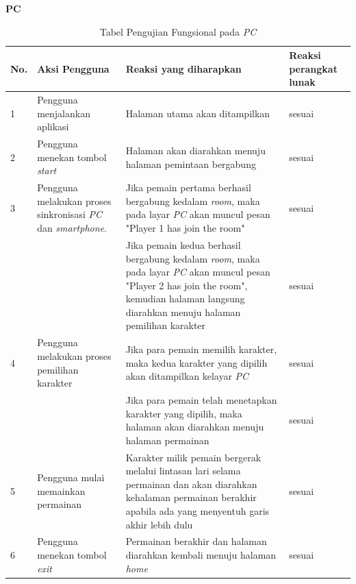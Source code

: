 \textbf{PC} \\
\begin{table}[H]
	\centering
	\caption{Tabel Pengujian Fungsional pada \textit{PC}}
	\begin{tabular}{|p{0.35cm}| p{3.5cm}| p{7cm}| p{2.5cm}|} \hline
		No. & Aksi Pengguna & Reaksi yang diharapkan & Reaksi perangkat lunak \\ \hline
		1 & Pengguna menjalankan aplikasi & Halaman utama akan ditampilkan & sesuai \\ \hline
		2 & Pengguna menekan tombol \textit{start} & Halaman akan diarahkan menuju halaman pemintaan bergabung & sesuai \\ \hline
		3 & Pengguna melakukan proses sinkronisasi \textit{PC} dan \textit{smartphone}. & Jika pemain pertama berhasil bergabung kedalam \textit{room}, maka pada layar \textit{PC} akan muncul pesan "Player 1 has join the room" & sesuai \\ \hline
		&  & Jika pemain kedua berhasil bergabung kedalam \textit{room}, maka pada layar \textit{PC} akan muncul pesan "Player 2 has join the room", kemudian halaman langsung diarahkan menuju halaman pemilihan karakter & sesuai \\ \hline
		4 & Pengguna melakukan proses pemilihan karakter & Jika para pemain memilih karakter, maka kedua karakter yang dipilih akan ditampilkan kelayar \textit{PC} & sesuai \\ \hline
		&  & Jika para pemain telah menetapkan karakter yang dipilih, maka halaman akan diarahkan menuju halaman permainan & sesuai \\ \hline
		5 & Pengguna mulai memainkan permainan & Karakter milik pemain bergerak melalui lintasan lari selama permainan dan akan diarahkan kehalaman permainan berakhir apabila ada yang menyentuh garis akhir lebih dulu & sesuai \\ \hline
		6 & Pengguna menekan tombol \textit{exit} & Permainan berakhir dan halaman diarahkan kembali menuju halaman \textit{home} & sesuai \\ \hline
	\end{tabular}
	\label{table:fungsionalPC}
\end{table} 

